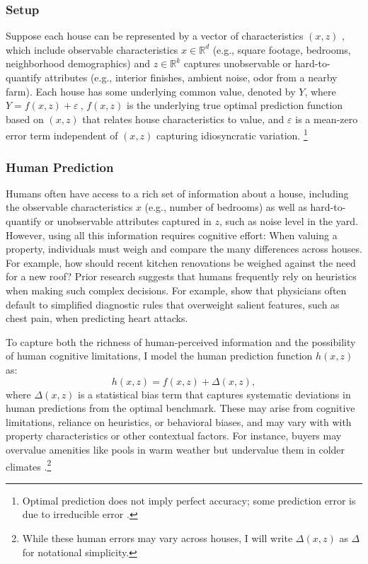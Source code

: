 \documentclass[11pt]{article}
\begin{document}
\subsubsection{Setup}
Suppose each house can be represented by a vector of characteristics $(x,z)$ , which include observable characteristics $x \in \mathbb{R}^d$ (e.g., square footage, bedrooms, neighborhood demographics) and $z \in \mathbb{R}^k$ captures unobservable or hard-to-quantify attributes (e.g., interior finishes, ambient noise, odor from a nearby farm). Each house has some underlying common value, denoted by $Y$, where $ Y = f(x, z) + \varepsilon\ $, $f(x, z)$ is the underlying true optimal prediction function based on $(x,z)$ that relates house characteristics to value, and $\varepsilon$ is a mean-zero error term independent of $(x,z)$ capturing idiosyncratic variation. \footnote{Optimal prediction does not imply perfect accuracy; some prediction error is due to irreducible error \citep{hastie2009elements}.}


\subsubsection{Human Prediction}
Humans often have access to a rich set of information about a house, including the observable characteristics \(x\) (e.g., number of bedrooms) as well as hard-to-quantify or unobservable attributes captured in \(z\), such as noise level in the yard. However, using all this information requires cognitive effort: When valuing a property, individuals must weigh and compare the many differences across houses. For example, how should recent kitchen renovations be weighed against the need for a new roof? Prior research suggests that humans frequently rely on heuristics when making such complex decisions. For example, \citet{mullainathanobermeyer2022} show that physicians often default to simplified diagnostic rules that overweight salient features, such as chest pain, when predicting heart attacks.

To capture both the richness of human-perceived information and the possibility of human cognitive limitations, I model the human prediction function $h(x, z)$ as:
\[
h(x, z) = f(x, z) + \Delta(x, z),
\]
 where \(\Delta(x, z)\) is a statistical bias term that captures systematic deviations in human predictions from the optimal benchmark. These may arise from cognitive limitations, reliance on heuristics, or behavioral biases, and may vary with with property characteristics or other contextual factors. For instance, buyers may overvalue amenities like pools in warm weather but undervalue them in colder climates \citep{busse2012}.\footnote{ While these human errors may vary across houses, I will write $ \Delta(x, z)$ as $\Delta$ for notational simplicity.}
\end{document}

